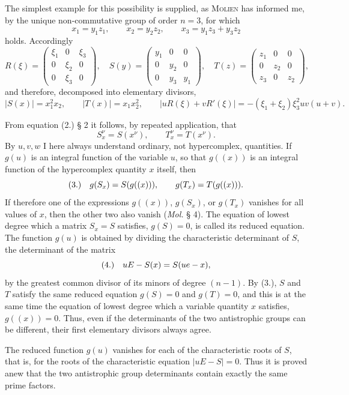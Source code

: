 \documentclass[11pt]{article}
\newcommand{\fnum}[1]{\textup{(\ensuremath{#1}.)}\quad}
\begin{document}
The simplest example for this possibility is supplied, as \textsc{Molien} has informed me, by the unique non-commutative group of order $n=3$, for which
\[
 x_1=y_1z_1,\qquad x_2=y_2z_2,\qquad x_3=y_1z_3+y_3z_2
\]
holds. Accordingly
\[
 R(\xi)=
 \begin{pmatrix}\xi_1&0&\xi_3\\0&\xi_2&0\\0&\xi_3&0\end{pmatrix},\quad
 S(y)=
 \begin{pmatrix}y_1&0&0\\0&y_2&0\\0&y_3&y_1\end{pmatrix},\quad
 T(z)=
 \begin{pmatrix}z_1&0&0\\0&z_2&0\\z_3&0&z_2\end{pmatrix},
\]
and therefore, decomposed into elementary divisors,
\[
 |S(x)|=x_1^2x_2,\qquad |T(x)|=x_1x_2^2,\qquad
 |uR(\xi)+vR'(\xi)|=-(\xi_1+\xi_2)\xi_3^2uv(u+v).
\]

From equation (2.) § 2 it follows, by repeated application, that
\[
 S_x^\nu=S(x^\nu),\qquad T_x^\nu=T(x^\nu).
\]
By $u,v,w$ I here always understand ordinary, not hypercomplex, quantities. If $g(u)$ is an integral function of the variable $u$, so that $g((x))$ is an integral function of the hypercomplex quantity $x$ itself, then
\[
\fnum{3} g(S_x)=S(g((x))),\qquad g(T_x)=T(g((x))).
\]
If therefore one of the expressions $g((x))$, $g(S_x)$, or $g(T_x)$ vanishes for all values of $x$, then the other two also vanish (\emph{Mol.} § 4). The equation of lowest degree which a matrix $S_x=S$ satisfies, $g(S)=0$, is called its reduced equation. The function $g(u)$ is obtained by dividing the characteristic determinant of $S$, the determinant of the matrix
\[
\fnum{4} uE-S(x)=S(ue-x),
\]
by the greatest common divisor of its minors of degree $(n-1)$. By (3.), $S$ and $T$ satisfy the same reduced equation $g(S)=0$ and $g(T)=0$, and this is at the same time the equation of lowest degree which a variable quantity $x$ satisfies, $g((x))=0$. Thus, even if the determinants of the two antistrophic groups can be different, their first elementary divisors always agree.

The reduced function $g(u)$ vanishes for each of the characteristic roots of $S$, that is, for the roots of the characteristic equation $|uE-S|=0$. Thus it is proved anew that the two antistrophic group determinants contain exactly the same prime factors.
\end{document}
